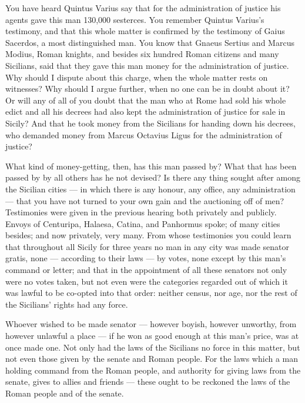  You have heard Quintus Varius say that for the administration of justice his agents gave this man 130,000 sesterces. You remember Quintus Varius's testimony, and that this whole matter is confirmed by the testimony of Gaius Sacerdos, a most distinguished man. You know that Gnaeus Sertius and Marcus Modius, Roman knights, and besides six hundred Roman citizens and many Sicilians, said that they gave this man money for the administration of justice. Why should I dispute about this charge, when the whole matter rests on witnesses? Why should I argue further, when no one can be in doubt about it? Or will any of all of you doubt that the man who at Rome had sold his whole edict and all his decrees had also kept the administration of justice for sale in Sicily? And that he took money from the Sicilians for handing down his decrees, who demanded money from Marcus Octavius Ligus for the administration of justice?

 What kind of money-getting, then, has this man passed by? What that has been passed by by all others has he not devised? Is there any thing sought after among the Sicilian cities --- in which there is any honour, any office, any administration --- that you have not turned to your own gain and the auctioning off of men? Testimonies were given in the previous hearing both privately and publicly. Envoys of Centuripa, Halaesa, Catina, and Panhormus spoke; of many cities besides; and now privately, very many. From whose testimonies you could learn that throughout all Sicily for three years no man in any city was made senator gratis, none --- according to their laws --- by votes, none except by this man's command or letter; and that in the appointment of all these senators not only were no votes taken, but not even were the categories regarded out of which it was lawful to be co-opted into that order: neither census, nor age, nor the rest of the Sicilians' rights had any force.

 Whoever wished to be made senator --- however boyish, however unworthy, from however unlawful a place --- if he won as good enough at this man's price, was at once made one. Not only had the laws of the Sicilians no force in this matter, but not even those given by the senate and Roman people. For the laws which a man holding command from the Roman people, and authority for giving laws from the senate, gives to allies and friends --- these ought to be reckoned the laws of the Roman people and of the senate.


